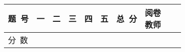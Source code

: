 \documentclass[twocolumn,landscape,UTF8]{ctexart}
\newcommand{\putzdx}{\marginpar{
		\parbox{1cm}{\vspace{-1.6cm}
			\rotatebox[origin=c]{90}{
				\usebox{\zdx}
		}}
}}
\begin{document}
\begin{spacing}{1.25}
\begin{center}

\begin{tabular}{|m{}|*{8}{m{}|}p{}|}
\hline
\centering  题~号 & \centering 一 & \centering 二 & \centering 三 & \centering 四& \centering 五 %
& \centering 总~分 & \makecell{阅卷\\教师} \rule{0pt}{3mm} \\
\hline
\centering 分~数 &  &  &  &  &  &  &  %
\rule{0pt}{8mm} \\\hline
\end{tabular}
\end{center}
\end{spacing}
\vspace{-0.5cm}
\setlength{\marginparsep}{1.7cm}
\putzdx %
\vspace{1cm}
\end{document}
